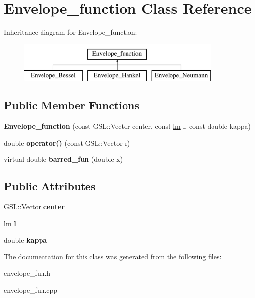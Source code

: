 \hypertarget{classEnvelope__function}{}\section{Envelope\+\_\+function Class Reference}
\label{classEnvelope__function}
Inheritance diagram for Envelope\+\_\+function\+:\begin{figure}[H]
\begin{center}
\leavevmode
\includegraphics[height=2.000000cm]{classEnvelope__function}
\end{center}
\end{figure}
\subsection*{Public Member Functions}
\begin{DoxyCompactItemize}
\item 
\mbox{\label{classEnvelope__function_ad8ae89e789829b57e4f1980170b08fec}} 
{\bfseries Envelope\+\_\+function} (const G\+S\+L\+::\+Vector center, const \hyperlink{structlm}{lm} l, const double kappa)
\item 
\mbox{\label{classEnvelope__function_a21a876fdc33d23725bdb25990d3f6e6a}} 
double {\bfseries operator()} (const G\+S\+L\+::\+Vector r)
\item 
\mbox{\label{classEnvelope__function_a85d6a52b27b3418b0436c6ceb8bff0ca}} 
virtual double {\bfseries barred\+\_\+fun} (double x)
\end{DoxyCompactItemize}
\subsection*{Public Attributes}
\begin{DoxyCompactItemize}
\item 
\mbox{\label{classEnvelope__function_a417479389e9b2e356517c99326c8ff76}} 
G\+S\+L\+::\+Vector {\bfseries center}
\item 
\mbox{\label{classEnvelope__function_aad90dd91f59e0610bc6bec9c57c867e8}} 
\hyperlink{structlm}{lm} {\bfseries l}
\item 
\mbox{\label{classEnvelope__function_ab9357bf2bb0318ca507d007baa28d563}} 
double {\bfseries kappa}
\end{DoxyCompactItemize}


The documentation for this class was generated from the following files\+:\begin{DoxyCompactItemize}
\item 
envelope\+\_\+fun.\+h\item 
envelope\+\_\+fun.\+cpp\end{DoxyCompactItemize}

